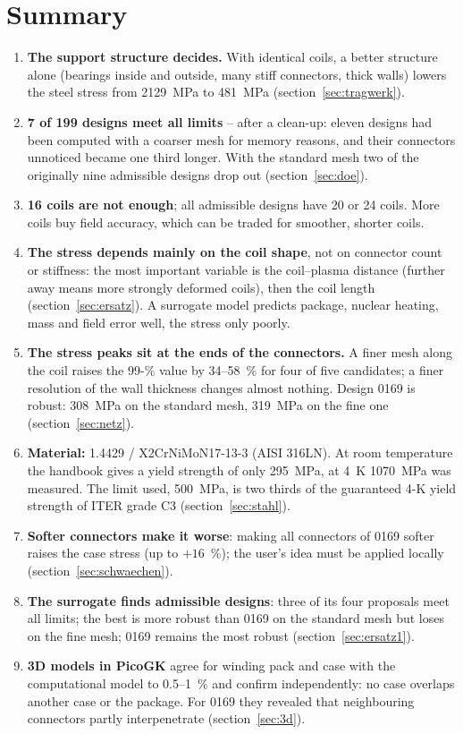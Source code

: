\documentclass[10pt,a4paper]{article}
\begin{document}
\section{Summary}
\begin{enumerate}\itemsep2pt
\item \textbf{The support structure decides.} With identical coils, a better structure alone (bearings inside and
outside, many stiff connectors, thick walls) lowers the steel stress from \SI{2129}{MPa} to \SI{481}{MPa}
(section~\ref{sec:tragwerk}).
\item \textbf{7 of 199 designs meet all limits} -- after a clean-up: eleven designs had been computed with a coarser
mesh for memory reasons, and their connectors unnoticed became one third longer. With the standard mesh two of the
originally nine admissible designs drop out (section~\ref{sec:doe}).
\item \textbf{16 coils are not enough}; all admissible designs have 20 or 24 coils. More coils buy field accuracy,
which can be traded for smoother, shorter coils.
\item \textbf{The stress depends mainly on the coil shape}, not on connector count or stiffness: the most important
variable is the coil--plasma distance (further away means more strongly deformed coils), then the coil length
(section~\ref{sec:ersatz}). A surrogate model predicts package, nuclear heating, mass and field error well, the stress
only poorly.
\item \textbf{The stress peaks sit at the ends of the connectors.} A finer mesh along the coil raises the 99-\% value
by 34--58~\% for four of five candidates; a finer resolution of the wall thickness changes almost nothing. Design 0169
is robust: \SI{308}{MPa} on the standard mesh, \SI{319}{MPa} on the fine one (section~\ref{sec:netz}).
\item \textbf{Material:} 1.4429 / X2CrNiMoN17-13-3 (AISI 316LN). At room temperature the handbook gives a yield strength
of only \SI{295}{MPa}, at \SI{4}{K} \SI{1070}{MPa} was measured. The limit used, \SI{500}{MPa}, is two thirds of the
guaranteed 4-K yield strength of ITER grade C3 (section~\ref{sec:stahl}).
\item \textbf{Softer connectors make it worse}: making all connectors of 0169 softer raises the case stress (up to
$+16$~\%); the user's idea must be applied locally (section~\ref{sec:schwaechen}).
\item \textbf{The surrogate finds admissible designs}: three of its four proposals meet all limits; the best is more
robust than 0169 on the standard mesh but loses on the fine mesh; 0169 remains the most robust
(section~\ref{sec:ersatz1}).
\item \textbf{3D models in PicoGK} agree for winding pack and case with the computational model to 0.5--1~\% and
confirm independently: no case overlaps another case or the package. For 0169 they revealed that neighbouring
connectors partly interpenetrate (section~\ref{sec:3d}).
\end{enumerate}
\end{document}
